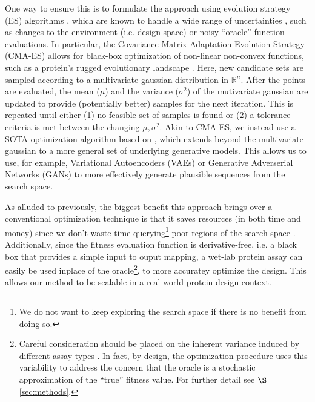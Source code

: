 \documentclass{article}
\begin{document}
One way to ensure this is to formulate the approach using evolution strategy
(ES) algorithms \cite{back1996evolutionary}, which are known to handle a wide
range of uncertainties \cite{jin2005evolutionary}, such as changes to the
environment (i.e. design space) or noisy ``oracle'' function evaluations. In
particular, the Covariance Matrix Adaptation Evolution Strategy (CMA-ES)
\cite{hansen1996adapting} allows for black-box optimization of non-linear
non-convex functions, such as a protein's rugged evolutionary landscape
\cite{macken1989protein}. Here, new candidate sets are sampled according to a
multivariate gaussian distribution in $\mathbb{R}^{n}$. After the points are
evaluated, the mean ($\mu$) and the variance ($\sigma^2$) of the mutivariate
gaussian are updated to provide (potentially better) samples for the next
iteration. This is repeated until either (1) no feasible set of samples is found
or (2) a tolerance criteria is met between the changing $\mu, \sigma^2$. Akin to
CMA-ES, we instead use a SOTA optimization algorithm based on
\cite{brookes2018design}, which extends beyond the multivariate gaussian to a
more general set of underlying generative models. This allows us to use, for
example, Variational Autoencoders (VAEs) \cite{kingma2013auto} or Generative
Adverserial Networks (GANs) \cite{goodfellow2014generative} to more effectively
generate plausible sequences from the search space.

As alluded to previously, the biggest benefit this approach brings over a
conventional optimization technique is that it saves resources (in both time and
money) since we don't waste time querying\footnote{We do not want to keep
exploring the search space if there is no benefit from doing so.} poor regions
of the search space \cite{sareni2000efficient}. Additionally, since the fitness
evaluation function is derivative-free, i.e. a black box that provides a simple
input to ouput mapping, a wet-lab protein assay can easily be used inplace of
the oracle\footnote{Careful consideration should be placed on the inherent
variance induced by different assay types \cite{noble2009quantitation}. In fact,
by design, the optimization procedure uses this variability to address the
concern that the oracle is a stochastic approximation of the ``true'' fitness
value. For further detail see $\S$\ref{sec:methods}.}, to more accuratey
optimize the design. This allows our method to be scalable in a real-world
protein design context.
\end{document}
